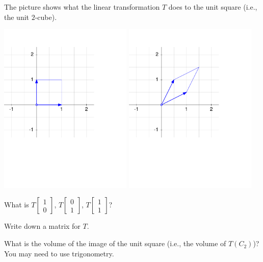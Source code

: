 \documentclass{problemset}
\newcommand{\mat}[1]{\begin{bmatrix}#1\end{bmatrix}}
\begin{document}
	\question
	The picture shows what the linear transformation $T$ does to the unit square (i.e., the unit $2$-cube).

	\begin{center}
	\includegraphics[width=2.5in]{images/transform1b.pdf}
	\includegraphics[width=2.5in]{images/transform2b.pdf}
	\end{center}

	\vspace{-6em}
	\begin{parts}
		\item What is $T\mat{1\\0}$, $T\mat{0\\1}$, $T\mat{1\\1}$?
		\item Write down a matrix for $T$.
		\item What is the volume of the image of the unit square (i.e., the volume of $T(C_2)$)?  You may need
			to use trigonometry.
	\end{parts}
	
\end{document}
